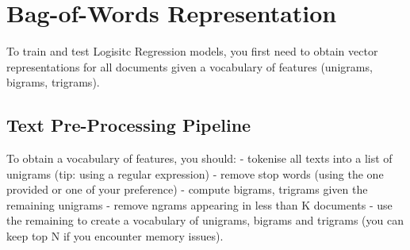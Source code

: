 \documentclass[11pt]{article}
\begin{document}
    \hypertarget{bag-of-words-representation}{%
\section{Bag-of-Words
Representation}\label{bag-of-words-representation}}

To train and test Logisitc Regression models, you first need to obtain
vector representations for all documents given a vocabulary of features
(unigrams, bigrams, trigrams).

\hypertarget{text-pre-processing-pipeline}{%
\subsection{Text Pre-Processing
Pipeline}\label{text-pre-processing-pipeline}}

To obtain a vocabulary of features, you should: - tokenise all texts
into a list of unigrams (tip: using a regular expression) - remove stop
words (using the one provided or one of your preference) - compute
bigrams, trigrams given the remaining unigrams - remove ngrams appearing
in less than K documents - use the remaining to create a vocabulary of
unigrams, bigrams and trigrams (you can keep top N if you encounter
memory issues).
\end{document}
